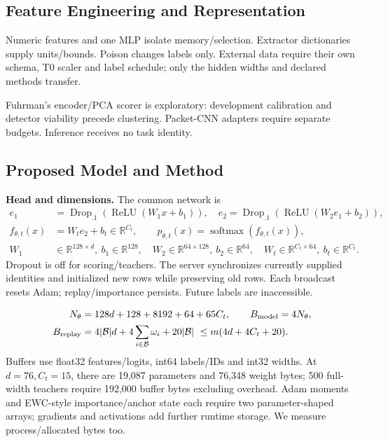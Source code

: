 \documentclass[10pt,a4paper]{article}
\begin{document}
\subsection{Feature Engineering and Representation}
Numeric features and one MLP isolate memory/selection. Extractor dictionaries supply units/bounds. Poison changes labels only.
External data require their own schema, T0 scaler and label schedule; only the hidden widths and declared methods transfer.

Fuhrman's encoder/PCA scorer is exploratory: development calibration and detector viability precede clustering. Packet-CNN adapters require separate budgets. Inference receives no task identity.

\subsection{Proposed Model and Method}
\textbf{Head and dimensions.} The common network is
\begin{equation}
\begin{aligned}
e_1&=\operatorname{Drop}_{.1}(\operatorname{ReLU}(W_1x+b_1)),\quad
e_2=\operatorname{Drop}_{.1}(\operatorname{ReLU}(W_2e_1+b_2)),\\
f_{\theta,t}(x)&=W_te_2+b_t\in\mathbb R^{C_t},\qquad
p_{\theta,t}(x)=\operatorname{softmax}(f_{\theta,t}(x)),\\
W_1&\in\mathbb R^{128\times d},\ b_1\in\mathbb R^{128},\quad
W_2\in\mathbb R^{64\times128},\ b_2\in\mathbb R^{64},\quad
W_t\in\mathbb R^{C_t\times64},\ b_t\in\mathbb R^{C_t}.
\end{aligned}
\label{eq:head}
\end{equation}
Dropout is off for scoring/teachers. The server synchronizes currently supplied identities and initialized new rows while preserving old rows. Each broadcast resets Adam; replay/importance persists. Future labels are inaccessible.

\begin{equation}
\begin{aligned}
N_\theta&=128d+128+8192+64+65C_t,\qquad B_{\rm model}=4N_\theta,\\
B_{\rm replay}&=4|\mathcal B|d+4\sum_{i\in\mathcal B}\omega_i+20|\mathcal B|\ \le m(4d+4C_t+20).
\end{aligned}
\label{eq:bytes}
\end{equation}
Buffers use float32 features/logits, int64 labels/IDs and int32 widths. At $d=76,C_t=15$, there are 19,087 parameters and 76,348 weight bytes; 500 full-width teachers require 192,000 buffer bytes excluding overhead. Adam moments and EWC-style importance/anchor state each require two parameter-shaped arrays; gradients and activations add further runtime storage. We measure process/allocated bytes too.
\end{document}
